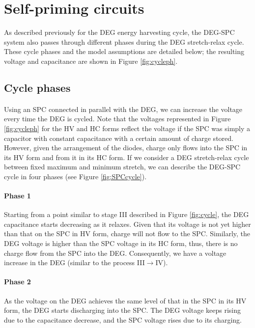 \section{Self-priming circuits}

\paragraph{}  As described previously for the DEG energy harvesting cycle, the DEG-SPC system also passes through different phases during the DEG stretch-relax cycle. These cycle phases and the model assumptions are detailed below; the resulting voltage and capacitance are shown in Figure \ref{fig:cycleph}.

\subsection{Cycle phases}

\paragraph{} Using an SPC connected in parallel with the  DEG, we can increase the voltage every time the DEG is cycled.  Note that the voltages represented in Figure \ref{fig:cycleph} for the HV and HC forms reflect the voltage if the SPC was simply a capacitor with constant capacitance with a certain amount of charge stored. However, given the arrangement of the diodes,  charge only flows into the SPC in its HV form and from it in its HC form.  If we consider a DEG stretch-relax cycle between fixed  maximum and minimum stretch, we can describe the DEG-SPC cycle in four phases (see Figure \ref{fig:SPCcycle}).

\paragraph{Phase 1} Starting from a point similar to stage III described in Figure \ref{fig:cycle}, the DEG capacitance starts decreasing as it relaxes. Given that its voltage is not yet higher than that on the SPC in HV form, charge will not flow to the SPC. Similarly, the DEG voltage is higher than the SPC voltage in its HC form, thus, there is no charge flow from the SPC into the DEG. Consequently, we have a voltage increase in the DEG (similar to the process III$\rightarrow$IV).
\paragraph{Phase 2} As the voltage on the DEG achieves the same level of that in the SPC in its HV form, the DEG starts discharging into the SPC. The DEG voltage keeps rising due to the capacitance decrease, and the SPC voltage rises due to its charging.
